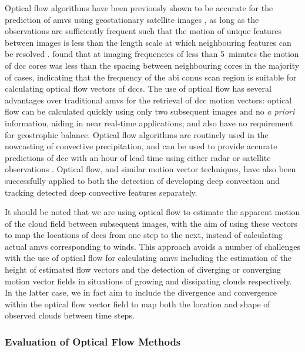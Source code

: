 Optical flow algorithms have been previously shown to be accurate for the prediction of \acrshort{amv}s using geostationary satellite images \citep{wu_deriving_2016}, as long as the observations are sufficiently frequent such that the motion of unique features between images is less than the length scale at which neighbouring features can be resolved \citep{bresky_feasibility_2006}.
\citet{heikenfeld_tobac_2019} found that at imaging frequencies of less than 5~minutes the motion of \acrshort{dcc} cores was less than the spacing between neighbouring cores in the majority of cases, indicating that the frequency of the \acrshort{abi} \acrshort{conus} scan region is suitable for calculating optical flow vectors of \acrshort{dcc}s.
The use of optical flow has several advantages over traditional \acrshort{amv}s for the retrieval of \acrshort{dcc} motion vectors: optical flow can be calculated quickly using only two subsequent images and no \textit{a priori} information, aiding in near real-time applications; and also have no requirement for geostrophic balance. 
Optical flow algorithms are routinely used in the nowcasting of convective precipitation, and can be used to provide accurate predictions of \acrshort{dcc} with an hour of lead time using either radar or satellite observations \citep[e.g.][]{bowler_development_2004, bechini_enhanced_2017, woo_operational_2017}.
Optical flow, and similar motion vector techniques, have also been successfully applied to both the detection of developing deep convection \citep{zinner_cb-tram:_2008, zhang_locating_2014} and tracking detected deep convective features \citep{senf_size-resolved_2018} separately.

It should be noted that we are using optical flow to estimate the apparent motion of the cloud field between subsequent images, with the aim of using these vectors to map the locations of \acrshort{dcc}s from one step to the next, instead of calculating actual \acrshort{amv}s corresponding to winds.
This approach avoids a number of challenges with the use of optical flow for calculating \acrshort{amv}s including the estimation of the height of estimated flow vectors and the detection of diverging or converging motion vector fields in situations of growing and dissipating clouds respectively.
In the latter case, we in fact aim to include the divergence and convergence within the optical flow vector field to map both the location and shape of observed clouds between time steps.

\subsubsection{Evaluation of Optical Flow Methods}

